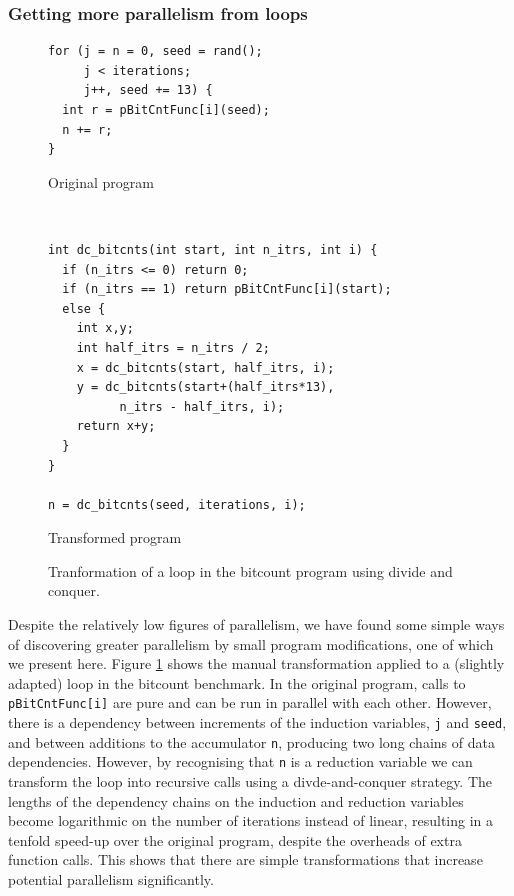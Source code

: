 \subsubsection{Getting more parallelism from loops}

\begin{figure}
  \centering
  \begin{subfloat}
    \begin{minipage}{3in}
      \begin{verbatim}
for (j = n = 0, seed = rand();
     j < iterations;
     j++, seed += 13) {
  int r = pBitCntFunc[i](seed);
  n += r;
}
      \end{verbatim}
    \end{minipage}%
    \label{orig}
    \caption{Original program}
  \end{subfloat}%
\\
  \begin{subfloat}
    \label{dnc-trans}
    \begin{minipage}{3in}
      \begin{verbatim}
int dc_bitcnts(int start, int n_itrs, int i) {
  if (n_itrs <= 0) return 0;
  if (n_itrs == 1) return pBitCntFunc[i](start);
  else {
    int x,y;
    int half_itrs = n_itrs / 2;
    x = dc_bitcnts(start, half_itrs, i);
    y = dc_bitcnts(start+(half_itrs*13),
          n_itrs - half_itrs, i);
    return x+y;
  }
}

n = dc_bitcnts(seed, iterations, i);
      \end{verbatim}
    \end{minipage}%
    \caption{Transformed program}
  \end{subfloat}%
  \caption{Tranformation of a loop in the bitcount program using divide and conquer.}
  \label{dnc}
\end{figure}

Despite the relatively low figures of parallelism, we have found some simple ways of discovering greater parallelism by small program modifications, one of which we present here.
Figure \ref{dnc} shows the manual transformation applied to a (slightly adapted) loop in the bitcount benchmark.
In the original program, calls to \texttt{pBitCntFunc[i]} are pure and can be run in parallel with each other.
However, there is a dependency between increments of the induction variables, \texttt{j} and \texttt{seed}, and between additions to the accumulator \texttt{n}, producing two long chains of data dependencies.
However, by recognising that \texttt{n} is a reduction variable we can transform the loop into recursive calls using a divde-and-conquer strategy.
The lengths of the dependency chains on the induction and reduction variables become logarithmic on the number of iterations instead of linear, resulting in a tenfold speed-up over the original program, despite the overheads of extra function calls.
This shows that there are simple transformations that increase potential parallelism significantly.

